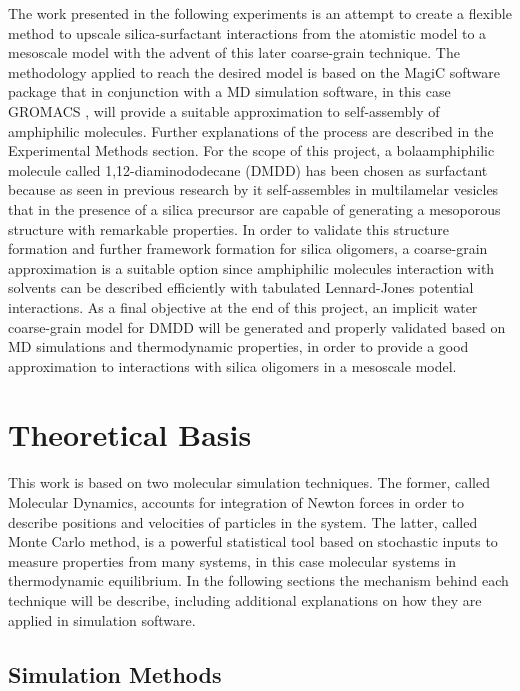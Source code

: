 \documentclass[10pt,a4paper,twoside]{article}
\begin{document}
The work presented in the following experiments is an attempt to create a flexible method to upscale silica-surfactant interactions \cite{silica1} from the atomistic model to a mesoscale model with the advent of this later coarse-grain technique. The methodology applied to reach the desired model is based on the MagiC software package \cite{magic} that in conjunction with a MD simulation software, in this case GROMACS \cite{gromacs}, will provide a suitable approximation to self-assembly of amphiphilic molecules. Further explanations of the process are described in the Experimental Methods section. For the scope of this project, a bolaamphiphilic molecule called 1,12-diaminododecane (DMDD) has been chosen as surfactant because as seen in previous research by  it self-assembles in multilamelar vesicles that in the presence of a silica precursor are capable of generating a mesoporous structure with remarkable properties. In order to validate this structure formation and further framework formation for silica oligomers, a coarse-grain approximation is a suitable option since amphiphilic molecules interaction with solvents can be described efficiently with tabulated Lennard-Jones potential interactions. As a final objective at the end of this project, an implicit water coarse-grain model for DMDD will be generated and properly validated based on MD simulations and thermodynamic properties, in order to provide a good approximation to interactions with silica oligomers in a mesoscale model. 
\section{Theoretical Basis}
This work is based on two molecular simulation techniques. The former, called Molecular Dynamics, accounts for integration of Newton forces in order to describe positions and velocities of particles in the system. The latter, called Monte Carlo method, is a powerful statistical tool based on stochastic inputs to measure properties from many systems, in this case molecular systems in thermodynamic equilibrium. In the following sections the mechanism behind each technique will be describe, including additional explanations on how they are applied in simulation software.
\subsection{Simulation Methods}
\end{document}
